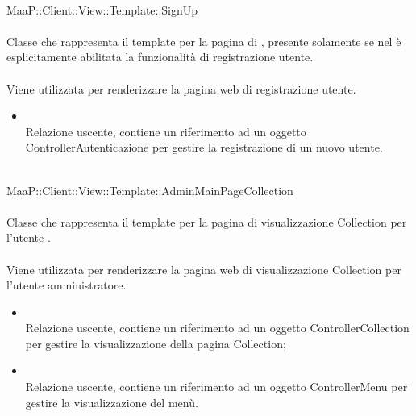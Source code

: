 \\
MaaP::Client::View::Template::SignUp\\
\\
Classe che rappresenta il template per la pagina di , presente solamente se nel  è esplicitamente abilitata la funzionalità di registrazione utente.\\
\\
Viene utilizzata per renderizzare la pagina web di registrazione utente.\\
\begin{itemize}
\item{}\\
Relazione uscente, contiene un riferimento ad un oggetto ControllerAutenticazione per gestire la registrazione di un nuovo utente.
\end{itemize}

\\
MaaP::Client::View::Template::AdminMainPageCollection\\
\\
Classe che rappresenta il template per la pagina di visualizzazione Collection per l'utente .\\
\\
Viene utilizzata per renderizzare la pagina web di visualizzazione Collection per l'utente amministratore.\\
\begin{itemize}
\item{}\\
Relazione uscente, contiene un riferimento ad un oggetto ControllerCollection per gestire la visualizzazione della pagina Collection;
\item{}\\
Relazione uscente, contiene un riferimento ad un oggetto ControllerMenu per gestire la visualizzazione del menù.
\end{itemize}


